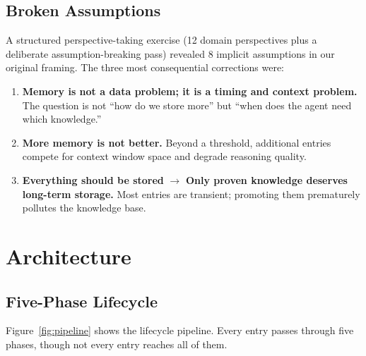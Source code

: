 \documentclass[11pt,a4paper]{article}
\begin{document}
\subsection{Broken Assumptions}

A structured perspective-taking exercise (12 domain perspectives plus a deliberate assumption-breaking pass) revealed 8 implicit assumptions in our original framing.
The three most consequential corrections were:

\begin{enumerate}[nosep]
    \item \textbf{Memory is not a data problem; it is a timing and context problem.} The question is not ``how do we store more'' but ``when does the agent need which knowledge.''
    \item \textbf{More memory is not better.} Beyond a threshold, additional entries compete for context window space and degrade reasoning quality.
    \item \textbf{Everything should be stored} $\rightarrow$ \textbf{Only proven knowledge deserves long-term storage.} Most entries are transient; promoting them prematurely pollutes the knowledge base.
\end{enumerate}


\section{Architecture}

\subsection{Five-Phase Lifecycle}

Figure~\ref{fig:pipeline} shows the lifecycle pipeline.
Every entry passes through five phases, though not every entry reaches all of them.
\end{document}
